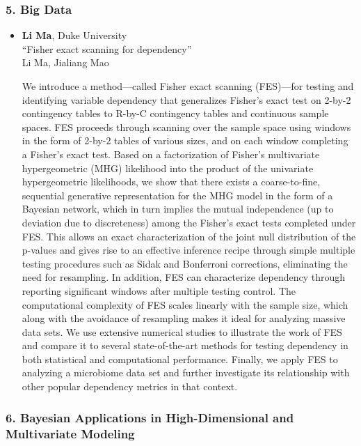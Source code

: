 \subsubsection*{5. Big Data}

\begin{itemize}
\item \textbf{Li Ma}, Duke University \\
``Fisher exact scanning for dependency'' \\
Li Ma, Jialiang Mao


We introduce a method—called Fisher exact scanning (FES)—for testing and identifying variable dependency that generalizes Fisher’s exact test on 2-by-2 contingency tables to R-by-C contingency tables and continuous sample spaces. FES proceeds through scanning over the sample space using windows in the form of 2-by-2 tables of various sizes, and on each window completing a Fisher’s exact test. Based on a factorization of Fisher’s multivariate hypergeometric (MHG) likelihood into the product of the univariate hypergeometric likelihoods, we show that there exists a coarse-to-fine, sequential generative representation for the MHG model in the form of a Bayesian network, which in turn implies the mutual independence (up to deviation due to discreteness) among the Fisher’s exact tests completed under FES. This allows an exact characterization of the joint null distribution of the p-values and gives rise to an effective inference recipe through simple multiple testing procedures such as Sidak and Bonferroni corrections, eliminating the need for resampling. In addition, FES can characterize dependency through reporting significant windows after multiple testing control. The computational complexity of FES scales linearly with the sample size, which along with the avoidance of resampling makes it ideal for analyzing massive data sets. We use extensive numerical studies to illustrate the work of FES and compare it to several state-of-the-art methods for testing dependency in both statistical and computational performance. Finally, we apply FES to analyzing a microbiome data set and further investigate its relationship with other popular dependency metrics in that context.

\end{itemize}

\subsubsection*{6. Bayesian Applications in High-Dimensional and Multivariate Modeling}

